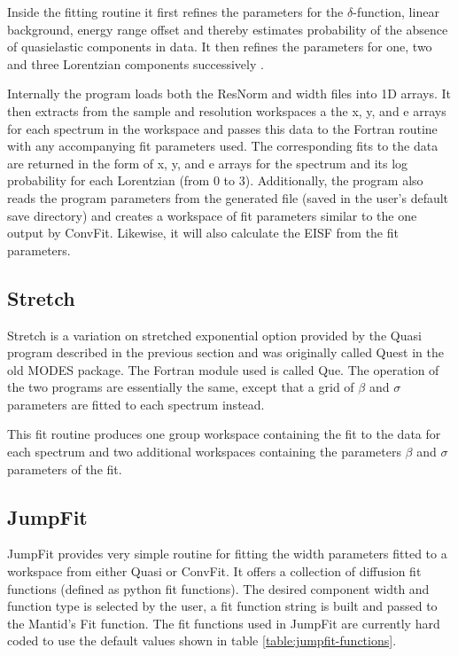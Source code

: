 \documentclass[paper=a4, fontsize=11pt]{scrartcl}	%
\numberwithin{equation}{section}															%
\numberwithin{figure}{section}																%
\numberwithin{table}{section}																%
\begin{document}
Inside the fitting routine it first refines the parameters for the $\delta$-function, linear background, energy range offset and thereby estimates probability of the absence of quasielastic components in data. It then refines the parameters for one, two and three Lorentzian components successively \cite{dssivia1992}.

Internally the program loads both the ResNorm and width files into 1D arrays. It then extracts from the sample and resolution workspaces a the x, y, and e arrays for each spectrum in the workspace and passes this data to the Fortran routine with any accompanying fit parameters used. The corresponding fits to the data are returned in the form of x, y, and e arrays for the spectrum and its log probability for each Lorentzian (from 0 to 3). Additionally, the program also reads the program parameters from the generated file (saved in the user's default save directory) and creates a workspace of fit parameters similar to the one output by ConvFit. Likewise, it will also calculate the EISF from the fit parameters.

\subsection{Stretch}
Stretch is a variation on stretched exponential option provided by the Quasi program described in the previous section and was originally called Quest in the old MODES package. The Fortran module used is called Que. The operation of the two programs are essentially the same, except that a grid of $\beta$ and $\sigma$ parameters are fitted to each spectrum instead.

This fit routine produces one group workspace containing the fit to the data for each spectrum and two additional workspaces containing the parameters $\beta$ and $\sigma$ parameters of the fit.

\subsection{JumpFit}
JumpFit provides very simple routine for fitting the width parameters fitted to a workspace from either Quasi or ConvFit. It offers a collection of diffusion fit functions (defined as python fit functions). The desired component width and function type is selected by the user, a fit function string is built and passed to the Mantid's Fit function. The fit functions used in JumpFit are currently hard coded to use the default values shown in table \ref{table:jumpfit-functions}.
\end{document}
